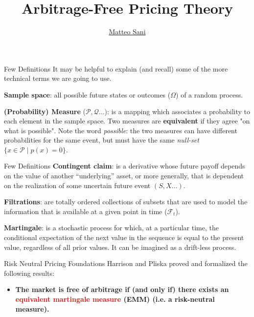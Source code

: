 \documentclass{beamer}
\title{Arbitrage-Free Pricing Theory}
\author{\href{mailto:matteo.sani@unisi.it}{Matteo Sani}}
\begin{document}
	\begin{frame}[plain]
		\maketitle
	\end{frame}        
	
\begin{frame}{Few Definitions}
		It may be helpful to explain (and recall) some of the more technical terms we are going to use.\newline
		
		\textbf{Sample space}: all possible future states or outcomes ($\Omega$) of a random process.\newline
		
		\textbf{(Probability) Measure} ($\mathcal{P}, \mathcal{Q}\ldots$): is a mapping which associates a probability to each element in the sample space. Two measures are \textbf{equivalent} if they agree "on what is possible". Note the word \emph{possible}: the two measures can have different probabilities for the same event, but must have the same \emph{null-set} $\{x\in {\mathcal {P}}\mid p (x)=0\}$. 
	\end{frame}

\begin{frame}{Few Definitions}
		\textbf{Contingent claim}: is a derivative whose future payoff depends on the value of another “underlying” asset, or more generally, that is dependent on the realization of some uncertain future event $(S, X\ldots)$.\newline
		
		\textbf{Filtrations}: are totally ordered collections of subsets that are used to model the information that is available at a given point in time ($\mathcal{F}_t$). \newline
		
		\textbf{Martingale}: is a stochastic process for which, at a particular time, the conditional expectation of the next value in the sequence is equal to the present value, regardless of all prior values. It can be imagined as a drift-less process.
	\end{frame}

	\begin{frame}{Risk Neutral Pricing Foundations}
	Harrison and Pliska proved and formalized the following results:
	\begin{itemize}
		\item \textbf{The market is free of arbitrage if (and only if) there exists an \textcolor{red}{equivalent martingale measure} (EMM) (i.e. a risk-neutral measure).}
	\end{itemize}
	\vfill
	\end{frame}
\end{document}
